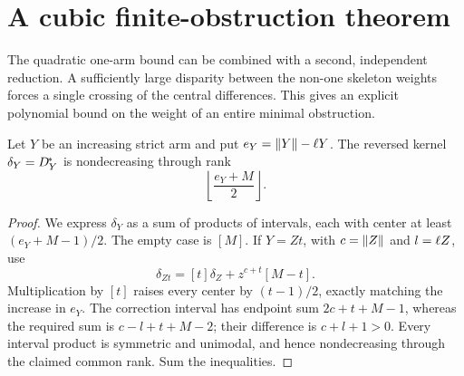 \section{A cubic finite-obstruction theorem}\label{sec:cubic}
The quadratic one-arm bound can be combined with a second, independent reduction. A sufficiently large disparity between the non-one skeleton weights forces a single crossing of the central differences. This gives an explicit polynomial bound on the weight of an entire minimal obstruction.

\begin{lemma}\label{lem:reversekernelgrowth}
Let $Y$ be an increasing strict arm and put $e_Y=\lVert Y\rVert-\ell Y$. The reversed kernel $\delta_Y=D_Y^{\!*}$ is nondecreasing through rank
\[
 \left\lfloor\frac{e_Y+M}{2}\right\rfloor.
\]
\end{lemma}
\begin{proof}
We express $\delta_Y$ as a sum of products of intervals, each with center at least $(e_Y+M-1)/2$. The empty case is $[M]$. If $Y=Zt$, with $c=\lVert Z\rVert$ and $l=\ell Z$, use
\[
 \delta_{Zt}=[t]\delta_Z+z^{c+t}[M-t].
\]
Multiplication by $[t]$ raises every center by $(t-1)/2$, exactly matching the increase in $e_Y$. The correction interval has endpoint sum $2c+t+M-1$, whereas the required sum is $c-l+t+M-2$; their difference is $c+l+1>0$. Every interval product is symmetric and unimodal, and hence nondecreasing through the claimed common rank. Sum the inequalities.
\end{proof}

